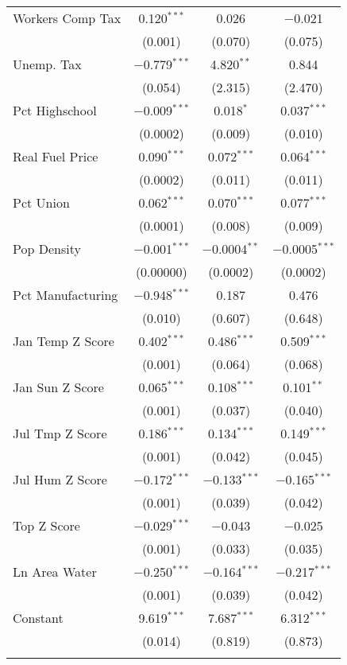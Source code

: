 \begin{table}[!htbp]
\begin{tabular}{@{\extracolsep{5pt}}lccc}
  Workers Comp Tax & 0.120$^{***}$ & 0.026 & $-$0.021 \\ 
  & (0.001) & (0.070) & (0.075) \\ 
  Unemp. Tax & $-$0.779$^{***}$ & 4.820$^{**}$ & 0.844 \\ 
  & (0.054) & (2.315) & (2.470) \\ 
  Pct Highschool & $-$0.009$^{***}$ & 0.018$^{*}$ & 0.037$^{***}$ \\ 
  & (0.0002) & (0.009) & (0.010) \\ 
  Real Fuel Price & 0.090$^{***}$ & 0.072$^{***}$ & 0.064$^{***}$ \\ 
  & (0.0002) & (0.011) & (0.011) \\ 
  Pct Union & 0.062$^{***}$ & 0.070$^{***}$ & 0.077$^{***}$ \\ 
  & (0.0001) & (0.008) & (0.009) \\ 
  Pop Density & $-$0.001$^{***}$ & $-$0.0004$^{**}$ & $-$0.0005$^{***}$ \\ 
  & (0.00000) & (0.0002) & (0.0002) \\ 
  Pct Manufacturing & $-$0.948$^{***}$ & 0.187 & 0.476 \\ 
  & (0.010) & (0.607) & (0.648) \\ 
  Jan Temp Z Score & 0.402$^{***}$ & 0.486$^{***}$ & 0.509$^{***}$ \\ 
  & (0.001) & (0.064) & (0.068) \\ 
  Jan Sun Z Score & 0.065$^{***}$ & 0.108$^{***}$ & 0.101$^{**}$ \\ 
  & (0.001) & (0.037) & (0.040) \\ 
  Jul Tmp Z Score & 0.186$^{***}$ & 0.134$^{***}$ & 0.149$^{***}$ \\ 
  & (0.001) & (0.042) & (0.045) \\ 
  Jul Hum Z Score & $-$0.172$^{***}$ & $-$0.133$^{***}$ & $-$0.165$^{***}$ \\ 
  & (0.001) & (0.039) & (0.042) \\ 
  Top Z Score & $-$0.029$^{***}$ & $-$0.043 & $-$0.025 \\ 
  & (0.001) & (0.033) & (0.035) \\ 
  Ln Area Water & $-$0.250$^{***}$ & $-$0.164$^{***}$ & $-$0.217$^{***}$ \\ 
  & (0.001) & (0.039) & (0.042) \\ 
  Constant & 9.619$^{***}$ & 7.687$^{***}$ & 6.312$^{***}$ \\ 
  & (0.014) & (0.819) & (0.873) \\ 
 \hline \\[-1.8ex] 

\end{tabular}
\end{table}
